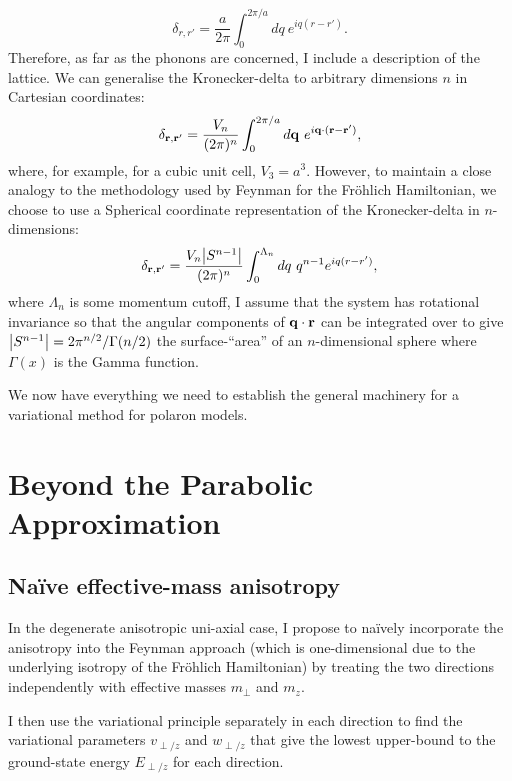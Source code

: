 \begin{equation}
    \delta _{r, r'} = \frac{a}{2\pi} \int_0^{2\pi / a} dq\ e^{i q (r - r')} .
\end{equation}
Therefore, as far as the phonons are concerned, I include a description of the lattice. We can generalise the Kronecker-delta to arbitrary dimensions $n$ in Cartesian coordinates:
\begin{equation}
    \delta_{\vb{r}, \vb{r'}} = \frac{V_n}{(2\pi)^n} \int_0^{2\pi/a} d\vb{q}\ e^{i \vb{q} \cdot (\vb{r} - \vb{r'})} ,
\end{equation}
where, for example, for a cubic unit cell, $V_3 = a^3$. However, to maintain a close analogy to the methodology used by Feynman for the Fr\"ohlich Hamiltonian, we choose to use a Spherical coordinate representation of the Kronecker-delta in $n$-dimensions:
\begin{equation}
    \delta_{\vb{r}, \vb{r'}} = \frac{V_n \abs{S^{n-1}}}{(2\pi)^n} \int_0^{\Lambda_n} dq\ q^{n-1} e^{i q (r - r')} ,
\end{equation}
where $\Lambda_n$ is some momentum cutoff, I assume that the system has rotational invariance so that the angular components of $\vb{q} \cdot \vb{r}$ can be integrated over to give $\abs{S^{n-1}} = 2\pi^{n/2} / \Gamma(n/2)$ the surface-``area'' of an $n$-dimensional sphere where $\Gamma(x)$ is the Gamma function.

We now have everything we need to establish the general machinery for a variational method for polaron models.

\section{Beyond the Parabolic Approximation}
\label{sec:3-2}

\subsection{Na\"ive effective-mass anisotropy}
\label{subsec:3-2-1}

In the degenerate anisotropic uni-axial case, I propose to na\"ively incorporate the anisotropy into the Feynman approach (which is one-dimensional due to the underlying isotropy of the Fr\"ohlich Hamiltonian) by treating the two directions independently with effective masses $m_\perp$ and $m_z$.

I then use the variational principle separately in each direction to find the variational parameters $v_{\perp/z}$ and $w_{\perp/z}$ that give the lowest upper-bound to the ground-state energy $E_{\perp/z}$ for each direction. 

